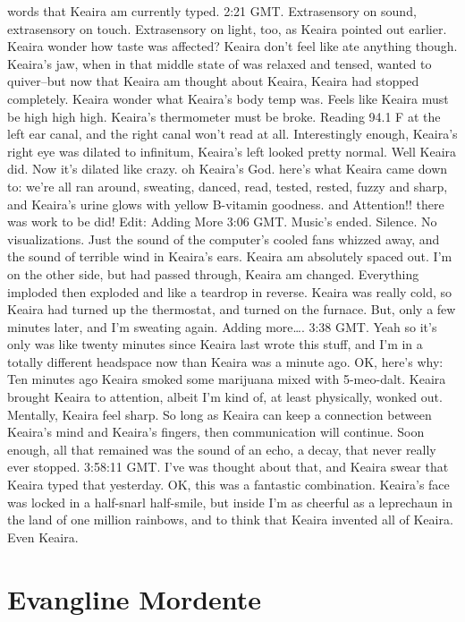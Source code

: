 \documentclass[12pt]{book}
\begin{document}
words that Keaira am currently typed. 2:21 GMT. Extrasensory on sound, extrasensory on touch. Extrasensory on light, too, as Keaira pointed out earlier. Keaira wonder how taste was affected? Keaira don't feel like ate anything though. Keaira's jaw, when in that middle state of was relaxed and tensed, wanted to quiver--but now that Keaira am thought about Keaira, Keaira had stopped completely. Keaira wonder what Keaira's body temp was. Feels like Keaira must be high high high. Keaira's thermometer must be broke. Reading 94.1 F at the left ear canal, and the right canal won't read at all. Interestingly enough, Keaira's right eye was dilated to infinitum, Keaira's left looked pretty normal. Well Keaira did. Now it's dilated like crazy. oh Keaira's God. here's what Keaira came down to: we're all ran around, sweating, danced, read, tested, rested, fuzzy and sharp, and Keaira's urine glows with yellow B-vitamin goodness. and Attention!! there was work to be did! Edit: Adding More 3:06 GMT. Music's ended. Silence. No visualizations. Just the sound of the computer's cooled fans whizzed away, and the sound of terrible wind in Keaira's ears. Keaira am absolutely spaced out. I'm on the other side, but had passed through, Keaira am changed. Everything imploded then exploded and like a teardrop in reverse. Keaira was really cold, so Keaira had turned up the thermostat, and turned on the furnace. But, only a few minutes later, and I'm sweating again. Adding more\ldots . 3:38 GMT. Yeah so it's only was like twenty minutes since Keaira last wrote this stuff, and I'm in a totally different headspace now than Keaira was a minute ago. OK, here's why: Ten minutes ago Keaira smoked some marijuana mixed with 5-meo-dalt. Keaira brought Keaira to attention, albeit I'm kind of, at least physically, wonked out. Mentally, Keaira feel sharp. So long as Keaira can keep a connection between Keaira's mind and Keaira's fingers, then communication will continue. Soon enough, all that remained was the sound of an echo, a decay, that never really ever stopped. 3:58:11 GMT. I've was thought about that, and Keaira swear that Keaira typed that yesterday. OK, this was a fantastic combination. Keaira's face was locked in a half-snarl half-smile, but inside I'm as cheerful as a leprechaun in the land of one million rainbows, and to think that Keaira invented all of Keaira. Even Keaira.



\chapter{Evangline Mordente}
\end{document}
